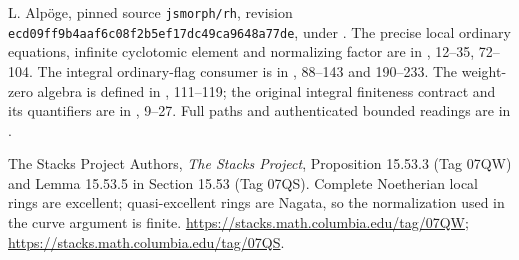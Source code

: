 L. Alp\"oge, pinned source \texttt{jsmorph/rh}, revision
\texttt{ecd09ff9b4aaf6c08f2b5ef17dc49ca9648a77de}, under
.
The precise local ordinary equations, infinite cyclotomic element and
normalizing factor are in
, 12--35,
72--104.  The integral ordinary-flag consumer is in
,
88--143 and 190--233.  The weight-zero algebra is defined in
, 111--119;
the original integral finiteness contract and its quantifiers are in
, 9--27.
Full paths and authenticated bounded readings are in
.

The Stacks Project Authors, \emph{The Stacks Project},
Proposition 15.53.3 (Tag 07QW) and Lemma 15.53.5 in
Section 15.53 (Tag 07QS).
Complete Noetherian local rings are excellent; quasi-excellent rings
are Nagata, so the normalization used in the curve argument is finite.
\url{https://stacks.math.columbia.edu/tag/07QW};
\url{https://stacks.math.columbia.edu/tag/07QS}.
